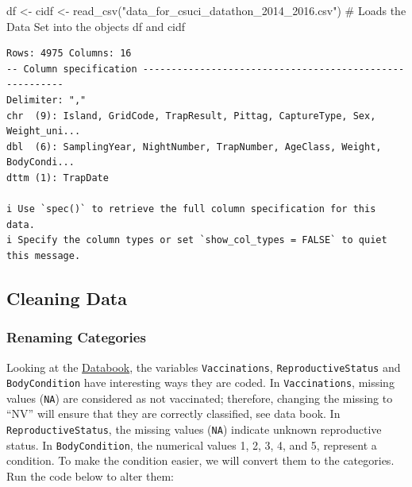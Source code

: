 \documentclass[
  letterpaper,
]{report}
\newenvironment{Shaded}{\begin{snugshade}}{\end{snugshade}}
\newcommand{\CommentTok}[1]{\textcolor[rgb]{0.37,0.37,0.37}{#1}}
\newcommand{\FunctionTok}[1]{\textcolor[rgb]{0.28,0.35,0.67}{#1}}
\newcommand{\NormalTok}[1]{\textcolor[rgb]{0.00,0.23,0.31}{#1}}
\newcommand{\OtherTok}[1]{\textcolor[rgb]{0.00,0.23,0.31}{#1}}
\newcommand{\StringTok}[1]{\textcolor[rgb]{0.13,0.47,0.30}{#1}}
\begin{document}
\begin{Shaded}
\begin{Highlighting}[]
\NormalTok{df }\OtherTok{\textless{}{-}}\NormalTok{ cidf }\OtherTok{\textless{}{-}} \FunctionTok{read\_csv}\NormalTok{(}\StringTok{"data\_for\_csuci\_datathon\_2014\_2016.csv"}\NormalTok{) }\CommentTok{\# Loads the Data Set into the objects df and cidf}
\end{Highlighting}
\end{Shaded}

\begin{verbatim}
Rows: 4975 Columns: 16
-- Column specification --------------------------------------------------------
Delimiter: ","
chr  (9): Island, GridCode, TrapResult, Pittag, CaptureType, Sex, Weight_uni...
dbl  (6): SamplingYear, NightNumber, TrapNumber, AgeClass, Weight, BodyCondi...
dttm (1): TrapDate

i Use `spec()` to retrieve the full column specification for this data.
i Specify the column types or set `show_col_types = FALSE` to quiet this message.
\end{verbatim}

\subsection{Cleaning Data}\label{cleaning-data}

\subsubsection{Renaming Categories}\label{renaming-categories}

Looking at the \href{}{Databook}, the variables \texttt{Vaccinations},
\texttt{ReproductiveStatus} and \texttt{BodyCondition} have interesting
ways they are coded. In \texttt{Vaccinations}, missing values
(\texttt{NA}) are considered as not vaccinated; therefore, changing the
missing to ``NV'' will ensure that they are correctly classified, see
data book. In \texttt{ReproductiveStatus}, the missing values
(\texttt{NA}) indicate unknown reproductive status. In
\texttt{BodyCondition}, the numerical values 1, 2, 3, 4, and 5,
represent a condition. To make the condition easier, we will convert
them to the categories. Run the code below to alter them:
\end{document}
